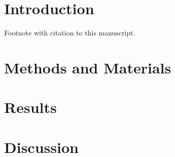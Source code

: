 
\section*{Introduction}
Footnote with citation to this manuscript.

\section*{Methods and Materials}

\section*{Results}

\section*{Discussion}

